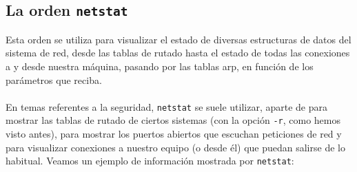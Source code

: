 \subsection{La orden {\tt netstat}}
Esta orden se utiliza para visualizar el estado de diversas estructuras de datos
del sistema de red, desde las tablas de rutado hasta el estado de todas las
conexiones a y desde nuestra m\'aquina, pasando por las tablas {\sc arp}, en 
funci\'on de los par\'ametros que reciba.\\
\\En temas referentes a la seguridad, {\tt netstat} se suele utilizar, aparte de
para mostrar las tablas de rutado de ciertos sistemas (con la opci\'on {\tt -r},
como hemos visto antes), para mostrar los puertos abiertos que escuchan 
peticiones de red y para visualizar conexiones a nuestro equipo (o desde \'el)
que puedan salirse de lo habitual. Veamos un ejemplo de informaci\'on mostrada
por {\tt netstat}:
\tt
